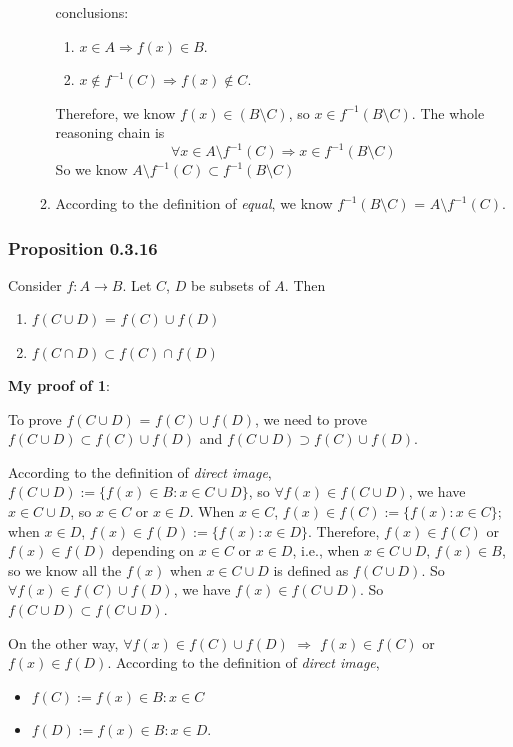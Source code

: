\documentclass[12pt, letterpaper, oneside]{book}
\begin{document}
\begin{enumerate}
\begin{enumerate}
        conclusions:
        \begin{enumerate}
          \item $x \in A \Rightarrow f(x) \in B$.
          \item $x \notin f^{-1}(C) \Rightarrow f(x) \notin C$.
        \end{enumerate}
        Therefore, we know $f(x) \in (B \setminus C)$, so $x \in f^{-1}(B
          \setminus C)$. The whole
        reasoning chain is
        \[
          \forall x \in A \setminus f^{-1}(C) \Rightarrow x \in f^{-1}(B
          \setminus C)
        \]
        So we know $A \setminus f^{-1}(C) \subset f^{-1}(B \setminus C)$
      \item According to the definition of \textit{equal}, we know $f^{-1}(B
        \setminus C)$ = $A \setminus f^{-1}(C)$.
    \end{enumerate}
\end{enumerate}

\subsubsection*{Proposition 0.3.16}

Consider $f: A \rightarrow B$. Let $C$, $D$ be subsets of $A$. Then
\begin{enumerate}
  \item $f(C \cup D)$ = $f(C) \cup f(D)$
  \item $f(C \cap D) \subset f(C) \cap f(D)$
\end{enumerate}

\textbf{My proof of 1}:

To prove $f(C \cup D)$ = $f(C) \cup f(D)$, we need to prove $f(C \cup D)
\subset f(C) \cup f(D)$ and $f(C \cup D) \supset f(C) \cup f(D)$.

According to the definition of \textit{direct image}, $f(C \cup D) := \{f(x)
\in B: x \in C \cup D\}$, so $\forall f(x) \in f(C \cup D)$, we have $x \in C
\cup D$, so $x \in C$ or $x \in D$. When $x \in C$, $f(x) \in f(C) := \{f(x): x
\in C\}$; when $x \in D$, $f(x) \in f(D) := \{f(x): x \in D\}$. Therefore, $f(x)
\in f(C)$ or $f(x) \in f(D)$ depending on $x \in C$ or $x \in D$, i.e., when $x
\in C \cup D$, $f(x) \in B$, so we know all the $f(x)$ when $x \in C \cup D$ is
defined as $f(C \cup D)$. So $\forall f(x) \in f(C) \cup f(D)$, we have $f(x)
\in f(C \cup D)$. So $f(C \cup D) \subset f(C \cup D)$.

On the other way, $\forall f(x) \in f(C) \cup f(D)$ $\Rightarrow$ $f(x) \in
f(C)$ or $f(x) \in f(D)$. According to the definition of \textit{direct image},
\begin{itemize}
  \item $f(C) := {f(x) \in B: x \in C}$
  \item $f(D) := {f(x) \in B: x \in D}$.
\end{itemize}
\end{document}
